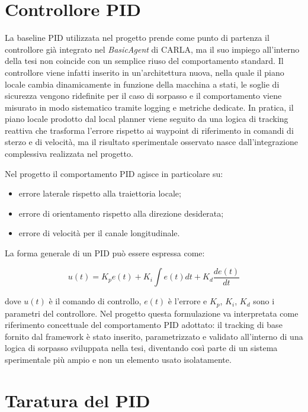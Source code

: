 \section{Controllore PID}

La baseline PID utilizzata nel progetto prende come punto di partenza il controllore già integrato nel \textit{BasicAgent} di CARLA, ma il suo impiego all'interno della tesi non coincide con un semplice riuso del comportamento standard. Il controllore viene infatti inserito in un'architettura nuova, nella quale il piano locale cambia dinamicamente in funzione della macchina a stati, le soglie di sicurezza vengono ridefinite per il caso di sorpasso e il comportamento viene misurato in modo sistematico tramite logging e metriche dedicate. In pratica, il piano locale prodotto dal local planner viene seguito da una logica di tracking reattiva che trasforma l'errore rispetto ai waypoint di riferimento in comandi di sterzo e di velocità, ma il risultato sperimentale osservato nasce dall'integrazione complessiva realizzata nel progetto.

Nel progetto il comportamento PID agisce in particolare su:

\begin{itemize}
    \item errore laterale rispetto alla traiettoria locale;
    \item errore di orientamento rispetto alla direzione desiderata;
    \item errore di velocità per il canale longitudinale.
\end{itemize}

La forma generale di un PID può essere espressa come:

\[
u(t) = K_p e(t) + K_i \int e(t)dt + K_d \frac{de(t)}{dt}
\]

dove \(u(t)\) è il comando di controllo, \(e(t)\) è l'errore e \(K_p\), \(K_i\), \(K_d\) sono i parametri del controllore. Nel progetto questa formulazione va interpretata come riferimento concettuale del comportamento PID adottato: il tracking di base fornito dal framework è stato inserito, parametrizzato e validato all'interno di una logica di sorpasso sviluppata nella tesi, diventando così parte di un sistema sperimentale più ampio e non un elemento usato isolatamente.

\section{Taratura del PID}

